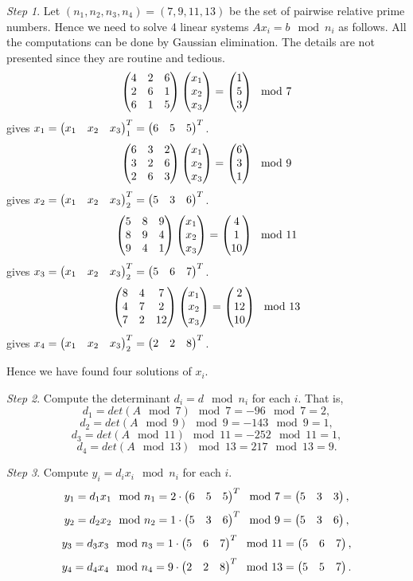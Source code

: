 \documentclass[12pt]{article}
\theoremstyle{plain}
\begin{document}
\emph{Step 1}. Let $(n_1, n_2, n_3, n_4) = (7, 9, 11, 13)$ be the set of pairwise relative prime numbers. Hence we need to solve 4 linear systems $Ax_i = b \mod n_i$ as follows. All the computations can be done by Gaussian elimination. The details are not presented since they are routine and tedious.
$$\begin{pmatrix}4 & 2 & 6 \\
2 & 6 & 1 \\
6 & 1 & 5\end{pmatrix}
\begin{pmatrix}x_1 \\ x_2 \\ x_3\end{pmatrix}=
\begin{pmatrix}1 \\ 5 \\ 3\end{pmatrix} \mod 7$$
gives $x_1 = \begin{pmatrix}x_1 & x_2 & x_3\end{pmatrix}_1^T = \begin{pmatrix}6 & 5 & 5\end{pmatrix}^T$.
$$\begin{pmatrix}6 & 3 & 2 \\
3 & 2 & 6 \\
2 & 6 & 3\end{pmatrix}
\begin{pmatrix}x_1 \\ x_2 \\ x_3\end{pmatrix}=
\begin{pmatrix}6 \\ 3 \\ 1\end{pmatrix} \mod 9$$
gives $x_2 = \begin{pmatrix}x_1 & x_2 & x_3\end{pmatrix}_2^T = \begin{pmatrix}5 & 3 & 6\end{pmatrix}^T$.
$$\begin{pmatrix}5 & 8 & 9 \\
8 & 9 & 4 \\
9 & 4 & 1\end{pmatrix}
\begin{pmatrix}x_1 \\ x_2 \\ x_3\end{pmatrix}=
\begin{pmatrix}4 \\ 1 \\ 10\end{pmatrix} \mod 11$$
gives $x_3 = \begin{pmatrix}x_1 & x_2 & x_3\end{pmatrix}_2^T = \begin{pmatrix}5 & 6 & 7\end{pmatrix}^T$.
$$\begin{pmatrix}8 & 4 & 7 \\
4 & 7 & 2 \\
7 & 2 & 12\end{pmatrix}
\begin{pmatrix}x_1 \\ x_2 \\ x_3\end{pmatrix}=
\begin{pmatrix}2 \\ 12 \\ 10\end{pmatrix} \mod 13$$
gives $x_4 = \begin{pmatrix}x_1 & x_2 & x_3\end{pmatrix}_2^T = \begin{pmatrix}2 & 2 & 8\end{pmatrix}^T$.

Hence we have found four solutions of $x_i$.

\emph{Step 2}. Compute the determinant $d_i = d \mod n_i$ for each $i$. That is, 
$$d_1 = det(A \mod 7) \mod 7 = -96 \mod 7 = 2,$$
$$d_2 = det(A \mod 9) \mod 9 = -143 \mod 9 = 1,$$ 
$$d_3 = det(A \mod 11) \mod 11 = -252 \mod 11 = 1,$$
$$d_4 = det(A \mod 13) \mod 13 = 217 \mod 13 = 9.$$

\emph{Step 3}. Compute $y_i = d_i x_i \mod n_i$ for each $i$.
$$y_1 = d_1 x_1 \mod n_1 = 2 \cdot \begin{pmatrix}6 & 5 & 5\end{pmatrix}^T \mod 7 = \begin{pmatrix}5 & 3 & 3\end{pmatrix},$$ 
$$y_2 = d_2 x_2 \mod n_2 = 1 \cdot \begin{pmatrix}5 & 3 & 6\end{pmatrix}^T \mod 9 = \begin{pmatrix}5 & 3 & 6\end{pmatrix},$$ 
$$y_3 = d_3 x_3 \mod n_3 = 1 \cdot \begin{pmatrix}5 & 6 & 7\end{pmatrix}^T \mod 11 = \begin{pmatrix}5 & 6 & 7\end{pmatrix},$$ 
$$y_4 = d_4 x_4 \mod n_4 = 9 \cdot \begin{pmatrix}2 & 2 & 8\end{pmatrix}^T \mod 13 = \begin{pmatrix}5 & 5 & 7\end{pmatrix}.$$ 
\end{document}
